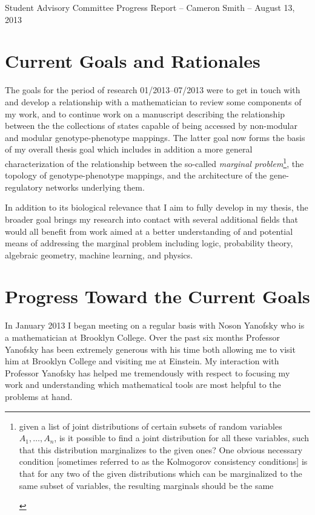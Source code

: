 \documentclass[11pt,letterpaper]{article}
\begin{document}
Student Advisory Committee Progress Report -- Cameron Smith -- August 13, 2013
\section{Current Goals and Rationales}
The goals for the period of research 01/2013--07/2013 were to get in touch with and develop a relationship with a mathematician to review some components of my work, and to continue work on a manuscript describing the relationship between the the collections of states capable of being accessed by non-modular and modular genotype-phenotype mappings. The latter goal now forms the basis of my overall thesis goal which includes in addition a more general characterization of the relationship between the so-called \emph{marginal problem}\footnote{\begin{tiny}
given a list of joint distributions of certain subsets of random variables $A_1, \ldots , A_n$, is it possible to find a joint distribution for all these variables, such that this distribution marginalizes to the given ones? One obvious necessary condition [sometimes referred to as the Kolmogorov consistency conditions] is that for any two of the given distributions which can be marginalized to the same subset of variables, the resulting marginals should be the same \cite{Fritz}
    \end{tiny}}, the topology of genotype-phenotype mappings, and the architecture of the gene-regulatory networks underlying them.

In addition to its biological relevance that I aim to fully develop in my thesis, the broader goal brings my research into contact with several additional fields that would all benefit from work aimed at a better understanding of and potential means of addressing the marginal problem including logic, probability theory, algebraic geometry, machine learning, and physics.

\section{Progress Toward the Current Goals}
In January 2013 I began meeting on a regular basis with Noson Yanofsky who is a mathematician at Brooklyn College. Over the past six months Professor Yanofsky has been extremely generous with his time both allowing me to visit him at Brooklyn College and visiting me at Einstein. My interaction with Professor Yanofsky has helped me tremendously with respect to focusing my work and understanding which mathematical tools are most helpful to the problems at hand.
\end{document}
